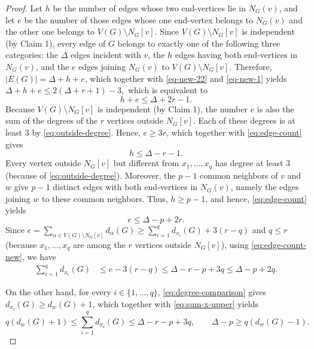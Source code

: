 \documentclass[10pt]{article}
\begin{document}
\begin{proof}
Let $h$ be
the number of edges whose two end-vertices lie in $N_G(v)$, and let $e$ be
the number of those edges whose one end-vertex belongs to $N_G(v)$ and the other one belongs to $V(G)\setminus N_G[v]$. Since $V(G)\setminus N_G[v]$ is independent (by Claim 1), every edge of $G$ belongs to exactly one of
the following three categories: the $\Delta$ edges incident with $v$, the
$h$ edges having both end-vertices in $N_G(v)$, and the $e$ edges
joining $N_G(v)$ to $V(G)\setminus N_G[v]$. Therefore,
$|E(G)|=\Delta+h+e$, which together with \eqref{eq-new-22} and  \eqref{eq-new-1} yields
$\Delta+h+e\le2(\Delta+r+1)-3,$
which is equivalent to
\begin{equation}\label{eq:edge-count}
h+e\le\Delta+2r-1.
\end{equation}
Because $V(G)\setminus N_G[v]$ is independent (by Claim 1), the number $e$ is also
the sum of the degrees of the $r$ vertices outside $N_G[v]$. Each of
these degrees is at least $3$ by \eqref{eq:outside-degree}. Hence,
$e\ge3r$, which together with \eqref{eq:edge-count} gives
\begin{equation}\label{eq-new-03}
h\le\Delta-r-1.
\end{equation}
Every vertex outside $N_G[v]$ but different from $x_1,\ldots,x_q$ has
degree at least $3$ (because of  \eqref{eq:outside-degree}). Moreover, the $p-1$ common neighbors of $v$ and
$w$ give $p-1$ distinct edges with both end-vertices in $N_G(v)$, namely the edges joining
$w$ to these common neighbors. Thus, $h\ge p-1$, and hence, \eqref{eq:edge-count} yields
\begin{equation}\label{eq:edge-count-new}
e\le\Delta-p+2r.
\end{equation}
Since $e=\sum_{\alpha\in V(G)\setminus N_G[v]}d_{\alpha}(G)\ge\sum_{i=1}^{q}d_{x_i}(G)+3(r-q)$ and $q\le r$ (because $x_1,\ldots,x_q$ are among the $r$ vertices outside
$N_G[v]$), using \eqref{eq:edge-count-new}, we have
\begin{align}
\sum_{i=1}^{q}d_{x_i}(G)
&\le e-3(r-q)\le\Delta-r-p+3q\le\Delta-p+2q.
\label{eq:sum-x-upper}
\end{align}

On the other hand, for every $i\in\{1,\dots,q\}$, \eqref{eq:degree-comparison} gives
$d_{x_i}(G)\ge d_w(G)+1$, which together with
\eqref{eq:sum-x-upper} yields
\begin{equation}\label{eq:delta-p-lower}
q(d_w(G)+1)\le\sum_{i=1}^{q}d_{x_i}(G)
\le\Delta-r-p+3q,
\qquad \Delta-p\ge q(d_w(G)-1).
\end{equation}


\end{proof}
\end{document}
